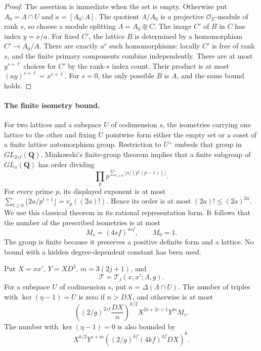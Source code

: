 \begin{proof}
The assertion is immediate when the set is empty.
Otherwise put \(A_0=\Lambda\cap U\) and
\(a=[A_0:A]\).  The quotient \(\Lambda/A_0\) is a
projective \(\mathcal O_E\)-module of rank \(s\), so
choose a module splitting \(\Lambda=A_0\oplus C\).
The image \(C'\) of \(B\) in \(C\) has index \(y=x/a\).
For fixed \(C'\), the lattice \(B\) is determined by a
homomorphism \(C'\to A_0/A\).  There are exactly \(a^s\)
such homomorphisms: locally \(C'\) is free of rank \(s\),
and the finite primary components combine independently.
There are at most \(y^{s+\ell}\) choices for \(C'\) by
the rank-\(s\) index count.  Their product is at most
\((ay)^{s+\ell}=x^{s+\ell}\).  For \(s=0\), the only
possible \(B\) is \(A\), and the same bound holds.
\end{proof}

\paragraph{The finite isometry bound.}
For two lattices and a subspace \(U\) of codimension \(s\),
the isometries carrying one lattice to the other and fixing
\(U\) pointwise form either the empty set or a coset of a
finite lattice automorphism group.  Restriction to \(U^\perp\)
embeds that group in \(GL_{2sf}(\mathbf Q)\).
Minkowski's finite-group theorem implies that a finite
subgroup of \(GL_a(\mathbf Q)\) has order dividing
\[
 \prod_p p^{\sum_{t\geq0}\lfloor a/(p^t(p-1))\rfloor}.
\]
For every prime \(p\), its displayed exponent is at most
\(\sum_{t\geq0}\lfloor2a/p^{t+1}\rfloor=v_p((2a)!)\).
Hence its order is at most \((2a)!\leq(2a)^{2a}\).
We use this classical theorem in its rational representation
form.\cite[Theorem 1]{serre-finite-groups}
It follows that the number of the prescribed isometries is
at most
\[
                 M_s=(4sf)^{4sf},\qquad M_0=1.
 \tag{EI11}
\]
The group is finite because it preserves a positive definite
form and a lattice.  No bound with a hidden degree-dependent
constant has been used.

\begin{theorem}
\label{thm:embedded-isometry-fixed-space-count}
Put \(X=xx'\), \(Y=XD^2\), \(m=3(2j+1)\), and
\[
 \mathcal T=\mathcal T_j(x,x';\Lambda,g).
\]
For a subspace \(U\) of codimension \(s\), put
\(n=\Delta(\Lambda\cap U)\).  The number of triples
with \(\ker(\eta-1)=U\) is zero if \(n>DX\), and otherwise
is at most
\[
 \left((2/g)^{2sf}\frac{DX}{n}\right)^{k/2}
           X^{2s+2c+1}Y^m M_s.
 \tag{EI12}
\]
The number with \(\ker(\eta-1)=0\) is also bounded by
\[
 X^{k/2}Y^{c+m}
       \left((2/g)^{kf}(4kf)^{4f}DX\right)^k .
 \tag{EI13}
\]
\end{theorem}

